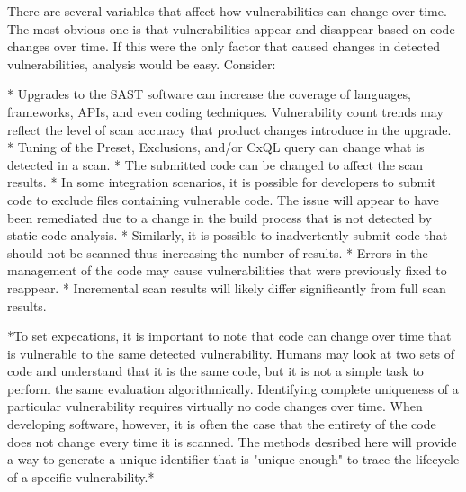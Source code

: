 
There are several variables that affect how vulnerabilities can change over time.  The most obvious one is that vulnerabilities appear and disappear based on code changes over time.  If this were the only factor that caused changes in detected vulnerabilities, analysis would be easy. Consider:

* Upgrades to the SAST software can increase the coverage of languages, frameworks, APIs, and even coding techniques.  Vulnerability count trends may reflect the level of scan accuracy that product changes introduce in the upgrade.
* Tuning of the Preset, Exclusions, and/or CxQL query can change what is detected in a scan.
* The submitted code can be changed to affect the scan results.
  * In some integration scenarios, it is possible for developers to submit code to exclude files containing vulnerable code. The issue will appear to have been remediated due to a change in the build process that is not detected by static code analysis.
  * Similarly, it is possible to inadvertently submit code that should not be scanned thus increasing the number of results.
* Errors in the management of the code may cause vulnerabilities that were previously fixed to reappear.
* Incremental scan results will likely differ significantly from full scan results.
  





*To set expecations, it is important to note that code can change over time that is vulnerable to the same detected vulnerability.  Humans may look at two sets of code and understand that it is the same code, but it is not a simple task to perform the same evaluation algorithmically.  Identifying complete uniqueness of a particular vulnerability requires virtually no code changes over time.  When developing software, however, it is often the case that the entirety of the code does not change every time it is scanned.  The methods desribed here will provide a way to generate a unique identifier that is "unique enough" to trace the lifecycle of a specific vulnerability.*


